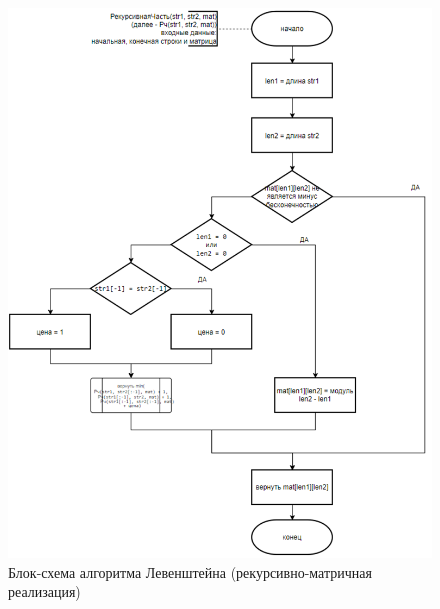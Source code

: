 \begin{figure}[H]
    \centering
    \includegraphics[width=1.05\textwidth]{img/block_1_3_1.png}
    \caption{Блок-схема алгоритма Левенштейна (рекурсивно-матричная реализация)}
\end{figure}

